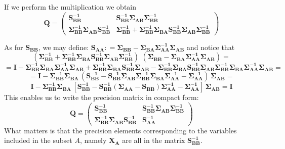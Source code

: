 \documentclass{book}
\begin{document}
If we perform the multiplication we obtain
$$
\mathbf{Q} = 
	\left( \begin{array}{ll} 
	\mathbf{S_{BB}^{-1}}   &
	\mathbf{S_{BB}^{-1}} \mathbf{\Sigma_{AB}} \mathbf{\Sigma_{BB}^{-1}}\\ 
	\mathbf{\Sigma_{BB}^{-1}} \mathbf{\Sigma_{AB}} \mathbf{S_{BB}^{-1}}& 
	\mathbf{\Sigma_{BB}^{-1}} + \mathbf{\Sigma_{BB}^{-1}} 
	\mathbf{\Sigma_{BA}} \mathbf{S_{BB}^{-1}}
    \mathbf{\Sigma_{AB}} \mathbf{\Sigma_{BB}^{-1}} 
\end{array} \right)
$$

As for $\mathbf{S_{BB}}$, we may define:
$\mathbf{S_{AA}} : =
\mathbf{\Sigma_{BB}} - \mathbf{\Sigma_{BA}} \mathbf{\Sigma^{-1}_{AA}} \mathbf{\Sigma_{AB}}$ and notice that
$$
\left(\mathbf{\Sigma_{BB}^{-1}} + \mathbf{\Sigma_{BB}^{-1}} \mathbf{\Sigma_{BA}} \mathbf{S_{BB}^{-1}}
\mathbf{\Sigma_{AB}} \mathbf{\Sigma_{BB}^{-1}} \right) \, \, 
\left(\mathbf{\Sigma_{BB}} - \mathbf{\Sigma_{BA}} \mathbf{\Sigma^{-1}_{AA}} \mathbf{\Sigma_{AB}} \right) =
$$
$$
= \mathbf{I} 
- \mathbf{\Sigma_{BB}^{-1}} \mathbf{\Sigma_{BA}} \mathbf{\Sigma_{AA}^{-1}} \mathbf{\Sigma_{AB}}
+ \mathbf{\Sigma_{BB}^{-1}} \mathbf{\Sigma_{BA}} \mathbf{S_{BB}^{-1}}
  \mathbf{\Sigma_{AB}} 
- \mathbf{\Sigma_{BB}^{-1}} \mathbf{\Sigma_{BA}}      \mathbf{S_{BB}^{-1}}
  \mathbf{\Sigma_{AB}}      \mathbf{\Sigma_{BB}^{-1}} \mathbf{\Sigma_{BA}}
  \mathbf{\Sigma^{-1}_{AA}} \mathbf{\Sigma_{AB}} = 
$$
$$
= \mathbf{I} - \mathbf{\Sigma_{BB}^{-1}} \mathbf{\Sigma_{BA}} \,
\left( \mathbf{S_{BB}^{-1}}  - \mathbf{S_{BB}^{-1}}  \mathbf{\Sigma_{AB}}      \mathbf{\Sigma_{BB}^{-1}} \mathbf{\Sigma_{BA}}
\mathbf{\Sigma^{-1}_{AA}} - \mathbf{\Sigma^{-1}_{AA}} \right) \,
\mathbf{\Sigma_{AB}} =
$$ 
$$
\mathbf{I} - \mathbf{\Sigma_{BB}^{-1}} \mathbf{\Sigma_{BA}} \,
\left[
\mathbf{S_{BB}^{-1}} - \mathbf{S_{BB}^{-1}} \left(\mathbf{\Sigma_{AA}} - \mathbf{S_{BB}} 
 \right)\mathbf{\Sigma^{-1}_{AA}} - \mathbf{\Sigma^{-1}_{AA}}
\right] \, \mathbf{\Sigma_{AB}} = \mathbf{I}
$$
This enables us to write the precision matrix in compact form:
\begin{equation}
\mathbf{Q} = 
\left( \begin{array}{ll} 
	\mathbf{S_{BB}^{-1}}   &
	\mathbf{S_{BB}^{-1}} \mathbf{\Sigma_{AB}} \mathbf{\Sigma_{BB}^{-1}}\\ 
	\mathbf{\Sigma_{BB}^{-1}} \mathbf{\Sigma_{AB}} \mathbf{S_{BB}^{-1}}& 
	\mathbf{S_{AA}^{-1}}  
\end{array} \right)
\end{equation}
What matters is that the precision elements corresponding to the variables included in the subset $A$, namely $\mathbf{X_A}$ are all in the matrix $\mathbf{S_{BB}^{-1}}$.
\end{document}
